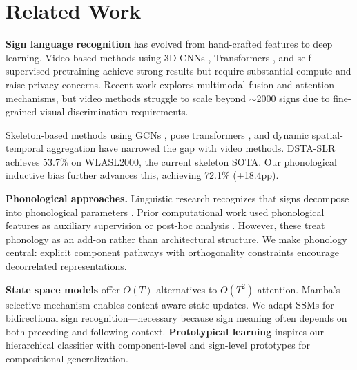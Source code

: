 \documentclass{article}
\theoremstyle{definition}
\theoremstyle{remark}
\begin{document}
\section{Related Work}

\textbf{Sign language recognition} has evolved from hand-crafted features \citep{cooper2011sign} to deep learning. Video-based methods using 3D CNNs \citep{carreira2017quo, feichtenhofer2019slowfast, lin2019tsm}, Transformers \citep{camgoz2020sign}, and self-supervised pretraining \citep{hu2021signbert} achieve strong results but require substantial compute and raise privacy concerns. Recent work explores multimodal fusion and attention mechanisms, but video methods struggle to scale beyond $\sim$2000 signs due to fine-grained visual discrimination requirements.

Skeleton-based methods using GCNs \citep{yan2018spatial, li2020word, shi2019two, duan2022pyskl}, pose transformers \citep{bohacek2022spoter}, and dynamic spatial-temporal aggregation \citep{hu2024dsta} have narrowed the gap with video methods. DSTA-SLR \citep{hu2024dsta} achieves 53.7\% on WLASL2000, the current skeleton SOTA. Our phonological inductive bias further advances this, achieving 72.1\% (+18.4pp).

\textbf{Phonological approaches.} Linguistic research recognizes that signs decompose into phonological parameters \citep{stokoe1960sign, battison1978lexical}. Prior computational work used phonological features as auxiliary supervision \citep{koller2015continuous} or post-hoc analysis \citep{bragg2019sign}. However, these treat phonology as an add-on rather than architectural structure. We make phonology central: explicit component pathways with orthogonality constraints encourage decorrelated representations.

\textbf{State space models} \citep{gu2022efficiently, gu2023mamba} offer $O(T)$ alternatives to $O(T^2)$ attention. Mamba's selective mechanism enables content-aware state updates. We adapt SSMs for bidirectional sign recognition---necessary because sign meaning often depends on both preceding and following context. \textbf{Prototypical learning} \citep{snell2017prototypical, hadsell2006dimensionality} inspires our hierarchical classifier with component-level and sign-level prototypes for compositional generalization.

\end{document}
